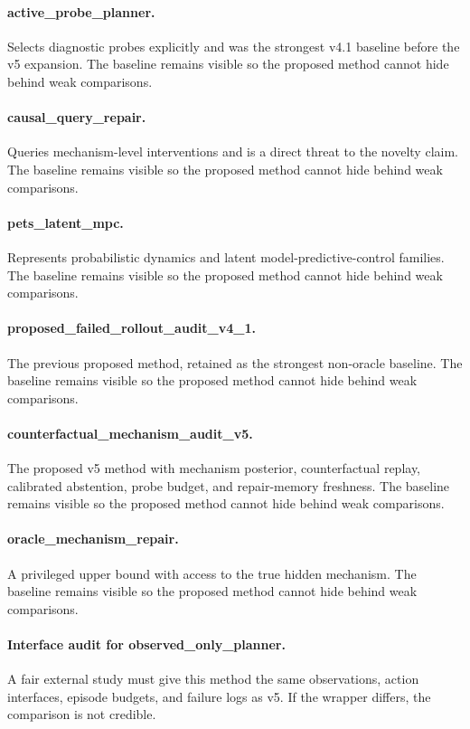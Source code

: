 \documentclass{article}
\begin{document}
\paragraph{active\_probe\_planner.} Selects diagnostic probes explicitly and was the strongest v4.1 baseline before the v5 expansion. The baseline remains visible so the proposed method cannot hide behind weak comparisons.
\paragraph{causal\_query\_repair.} Queries mechanism-level interventions and is a direct threat to the novelty claim. The baseline remains visible so the proposed method cannot hide behind weak comparisons.
\paragraph{pets\_latent\_mpc.} Represents probabilistic dynamics and latent model-predictive-control families. The baseline remains visible so the proposed method cannot hide behind weak comparisons.
\paragraph{proposed\_failed\_rollout\_audit\_v4\_1.} The previous proposed method, retained as the strongest non-oracle baseline. The baseline remains visible so the proposed method cannot hide behind weak comparisons.
\paragraph{counterfactual\_mechanism\_audit\_v5.} The proposed v5 method with mechanism posterior, counterfactual replay, calibrated abstention, probe budget, and repair-memory freshness. The baseline remains visible so the proposed method cannot hide behind weak comparisons.
\paragraph{oracle\_mechanism\_repair.} A privileged upper bound with access to the true hidden mechanism. The baseline remains visible so the proposed method cannot hide behind weak comparisons.
\paragraph{Interface audit for observed\_only\_planner.} A fair external study must give this method the same observations, action interfaces, episode budgets, and failure logs as v5. If the wrapper differs, the comparison is not credible.
\end{document}
